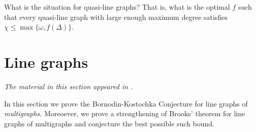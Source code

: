 \begin{question}
What is the situation for quasi-line graphs?  That is, what is the optimal
$f$ such that every quasi-line graph with large enough maximum degree satisfies
$\chi \leq \max\{\omega, f(\Delta)\}$.
\end{question}

\section{Line graphs}\label{LineGraphSection}
\begin{center}
\emph{The material in this section appeared in \cite{rabern2011strengthening}.}
\end{center}

In this section we prove the Bornodin-Kostochka Conjecture for line graphs of \emph{multigraphs}.  Moreoever, we prove a strengthening of Brooks' theorem for line graphs of multigraphs and conjecture the best possible such bound.

